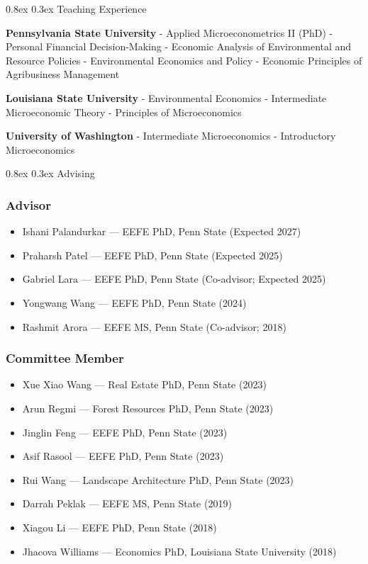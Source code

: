 \documentclass[
  11pt,
]{article}
\makeatletter
\providecommand{\tightlist}{%
  \setlength{\itemsep}{0pt}\setlength{\parskip}{0pt}}
\renewcommand\subsection{
  \@startsection{subsection}{2}{0pt}
  {0.8ex}
  {0.3ex}
  {\sffamily\bfseries\large}
}
\makeatother
\begin{document}
\subsection{Teaching Experience}\label{teaching-experience}

\textbf{Pennsylvania State University} - Applied Microeconometrics II
(PhD) - Personal Financial Decision-Making - Economic Analysis of
Environmental and Resource Policies - Environmental Economics and Policy
- Economic Principles of Agribusiness Management

\textbf{Louisiana State University} - Environmental Economics -
Intermediate Microeconomic Theory - Principles of Microeconomics

\textbf{University of Washington} - Intermediate Microeconomics -
Introductory Microeconomics

\subsection{Advising}\label{advising}

\subsubsection{Advisor}\label{advisor}

\begin{itemize}
\tightlist
\item
  Ishani Palandurkar --- EEFE PhD, Penn State (Expected 2027)
\item
  Praharsh Patel --- EEFE PhD, Penn State (Expected 2025)
\item
  Gabriel Lara --- EEFE PhD, Penn State (Co-advisor; Expected 2025)
\item
  Yongwang Wang --- EEFE PhD, Penn State (2024)
\item
  Rashmit Arora --- EEFE MS, Penn State (Co-advisor; 2018)
\end{itemize}

\subsubsection{Committee Member}\label{committee-member}

\begin{itemize}
\tightlist
\item
  Xue Xiao Wang --- Real Estate PhD, Penn State (2023)
\item
  Arun Regmi --- Forest Resources PhD, Penn State (2023)
\item
  Jinglin Feng --- EEFE PhD, Penn State (2023)
\item
  Asif Rasool --- EEFE PhD, Penn State (2023)
\item
  Rui Wang --- Landscape Architecture PhD, Penn State (2023)
\item
  Darrah Peklak --- EEFE MS, Penn State (2019)
\item
  Xiagou Li --- EEFE PhD, Penn State (2018)
\item
  Jhacova Williams --- Economics PhD, Louisiana State University (2018)
\end{itemize}
\end{document}
